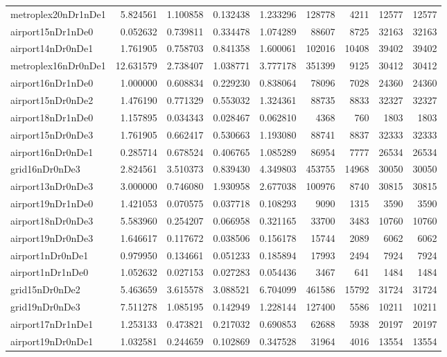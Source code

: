 \begin{longtable}{|l|r|r|r|r|r|r|r|r|}
metroplex20nDr1nDe1 & 5.824561 & 1.100858 & 0.132438 & 1.233296 & 128778 & 4211 & 12577 & 12577 \\
airport15nDr1nDe0 & 0.052632 & 0.739811 & 0.334478 & 1.074289 & 88607 & 8725 & 32163 & 32163 \\
airport14nDr0nDe1 & 1.761905 & 0.758703 & 0.841358 & 1.600061 & 102016 & 10408 & 39402 & 39402 \\
metroplex16nDr0nDe1 & 12.631579 & 2.738407 & 1.038771 & 3.777178 & 351399 & 9125 & 30412 & 30412 \\
airport16nDr1nDe0 & 1.000000 & 0.608834 & 0.229230 & 0.838064 & 78096 & 7028 & 24360 & 24360 \\
airport15nDr0nDe2 & 1.476190 & 0.771329 & 0.553032 & 1.324361 & 88735 & 8833 & 32327 & 32327 \\
airport18nDr1nDe0 & 1.157895 & 0.034343 & 0.028467 & 0.062810 & 4368 & 760 & 1803 & 1803 \\
airport15nDr0nDe3 & 1.761905 & 0.662417 & 0.530663 & 1.193080 & 88741 & 8837 & 32333 & 32333 \\
airport16nDr0nDe1 & 0.285714 & 0.678524 & 0.406765 & 1.085289 & 86954 & 7777 & 26534 & 26534 \\
grid16nDr0nDe3 & 2.824561 & 3.510373 & 0.839430 & 4.349803 & 453755 & 14968 & 30050 & 30050 \\
airport13nDr0nDe3 & 3.000000 & 0.746080 & 1.930958 & 2.677038 & 100976 & 8740 & 30815 & 30815 \\
airport19nDr1nDe0 & 1.421053 & 0.070575 & 0.037718 & 0.108293 & 9090 & 1315 & 3590 & 3590 \\
airport18nDr0nDe3 & 5.583960 & 0.254207 & 0.066958 & 0.321165 & 33700 & 3483 & 10760 & 10760 \\
airport19nDr0nDe3 & 1.646617 & 0.117672 & 0.038506 & 0.156178 & 15744 & 2089 & 6062 & 6062 \\
airport1nDr0nDe1 & 0.979950 & 0.134661 & 0.051233 & 0.185894 & 17993 & 2494 & 7924 & 7924 \\
airport1nDr1nDe0 & 1.052632 & 0.027153 & 0.027283 & 0.054436 & 3467 & 641 & 1484 & 1484 \\
grid15nDr0nDe2 & 5.463659 & 3.615578 & 3.088521 & 6.704099 & 461586 & 15792 & 31724 & 31724 \\
grid19nDr0nDe3 & 7.511278 & 1.085195 & 0.142949 & 1.228144 & 127400 & 5586 & 10211 & 10211 \\
airport17nDr1nDe1 & 1.253133 & 0.473821 & 0.217032 & 0.690853 & 62688 & 5938 & 20197 & 20197 \\
airport19nDr0nDe1 & 1.032581 & 0.244659 & 0.102869 & 0.347528 & 31964 & 4016 & 13554 & 13554 \\

\end{longtable}
